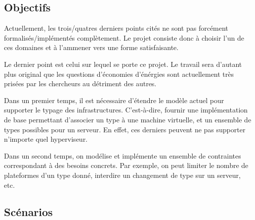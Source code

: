 \documentclass[a4paper]{article}
\begin{document}
\subsection{Objectifs}
Actuellement, les trois/quatres derniers points cités ne sont pas forcément
formalisés/implémentés complètement. Le projet consiste donc à choisir l'un
de ces domaines et à l'ammener vers une forme satisfaisante.

Le dernier point est celui sur lequel se porte ce projet. Le travail sera
d'autant plus original que les questions d'économies d'énérgies sont actuellement
très prisées par les chercheurs au détriment des autres.

Dans un premier temps, il est nécessaire d'étendre le modèle actuel
pour supporter le typage des infrastructures. C'est-à-dire, fournir
une implémentation de base permettant d'associer un type à une machine
virtuelle, et un ensemble de types possibles pour un serveur. En effet,
ces derniers peuvent ne pas supporter n'importe quel hyperviseur.

Dans un second temps, on modélise et implémente un ensemble de contraintes
correspondant à des besoins concrets. Par exemple, on peut limiter le
nombre de plateformes d'un type donné, interdire un changement de type
sur un serveur, etc.

\subsection{Scénarios}
\end{document}

